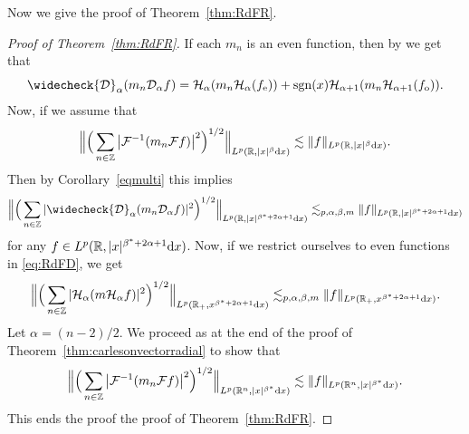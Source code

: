 \documentclass[11pt,oneside]{amsart}
\numberwithin{equation}{section}
\theoremstyle{definition}
\newcommand{\RR}{\mathbb{R}}
\newcommand{\ZZ}{\mathbb{Z}}
\newcommand{\calF}{\mathcal{F}}
\newcommand{\calH}{\mathcal{H}}
\newcommand{\calD}{\mathcal{D}}
\newcommand{\sgn}{\operatorname{sgn}}
\begin{document}
Now we give the proof of Theorem~\ref{thm:RdFR}.
\begin{proof}[Proof of Theorem~\ref{thm:RdFR}]
If each $m_n$ is an even function, then by \cite[Lemma 3.7]{Slom} we get that
\begin{equation*}
    \widecheck{\calD}_\alpha(m_n \calD_\alpha f)=\calH_\alpha(m_n\calH_\alpha(f_{\rm e}))+ \sgn(x)\calH_{\alpha+1}(m_n\calH_{\alpha+1}(f_{\rm o})).
\end{equation*}
Now, if we assume that
\begin{equation*}
    \Big\|\Big(\sum_{n\in\ZZ}\big|\calF^{-1}(m_n\calF f)\big|^2\Big)^{1/2}\Big\|_{L^p(\RR,|x|^\beta{\rm d}x)}\lesssim\|f\|_{L^p(\RR,|x|^\beta {\rm d}x)}.
\end{equation*}
Then by Corollary~\ref{eqmulti} this implies 
\begin{equation}\label{eq:RdFD}
    \Big\|\Big(\sum_{n\in\ZZ}|\widecheck{\calD}_\alpha(m_n \calD_\alpha f)|^2\Big)^{1/2}\Big\|_{L^p(\RR,|x|^{\beta^\ast+2\alpha+1}{\rm d}x)}\lesssim_{p,\alpha,\beta,m} \|f\|_{L^p(\RR,|x|^{\beta^\ast+2\alpha+1}{\rm d}x)}
\end{equation}
for any $f\in L^p(\RR,|x|^{\beta^\ast+2\alpha+1}{\rm d}x)$. Now, if we restrict ourselves to even functions in \eqref{eq:RdFD}, we get
\begin{equation*}
    \Big\|\Big(\sum_{n\in\ZZ}|\calH_\alpha(m\calH_\alpha f)|^2\Big)^{1/2}\Big\|_{L^p(\RR_+,x^{\beta^\ast+2\alpha+1}{\rm d}x)}\lesssim_{p,\alpha,\beta,m}\|f\|_{L^p(\RR_+,x^{\beta^\ast+2\alpha+1}{\rm d}x)}.
\end{equation*}
Let $\alpha=(n-2)/2$. We proceed as at the end of the proof of Theorem~\eqref{thm:carlesonvectorradial} to show that
\begin{equation*}
    \Big\|\Big(\sum_{n\in\ZZ}\big|\calF^{-1}(m_n\calF f)\big|^2\Big)^{1/2}\Big\|_{L^p(\RR^n,|x|^{\beta^*}{\rm d}x)}\lesssim\|f\|_{L^p(\RR^n,|x|^{\beta^*} {\rm d}x)}.
\end{equation*}
This ends the proof the proof of Theorem~\ref{thm:RdFR}.
\end{proof}
\end{document}
